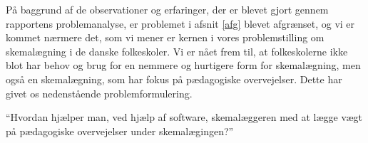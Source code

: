 På baggrund af de observationer og erfaringer, der er blevet gjort gennem rapportens problemanalyse, er problemet i afsnit \ref{afg} blevet afgrænset, og vi er kommet nærmere det, som vi mener er kernen i vores problemstilling om skemalægning i de danske folkeskoler. Vi er nået frem til, at folkeskolerne ikke blot har behov og brug for en nemmere og hurtigere form for skemalægning, men også en skemalægning, som har fokus på pædagogiske overvejelser. Dette har givet os nedenstående problemformulering.

``Hvordan hjælper man, ved hjælp af software, skemalæggeren med at lægge vægt på pædagogiske overvejelser under skemalægingen?''
